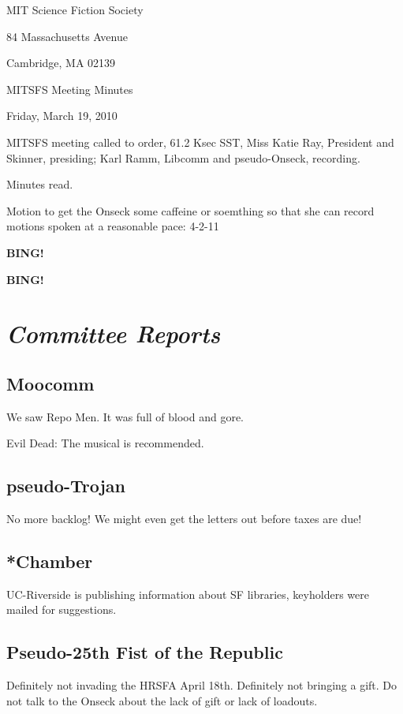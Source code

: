 \documentclass[10pt]{article}
\newcommand{\bing}{{\bf BING!} }
\newcommand{\goto}[1]{\bing \vskip 12pt \section*{{\em{#1}}}}
\newcommand{\skinner}{Miss Katie Ray, President and Skinner}
\newcommand{\onseck}{Karl Ramm, Libcomm and pseudo-Onseck}
\newcommand{\meetingdate}{Friday, March 19, 2010}
\begin{document}
\begin{center}

MIT Science Fiction Society

84 Massachusetts Avenue

Cambridge, MA 02139

\vspace{12pt}

MITSFS Meeting Minutes

\meetingdate

\end{center}

\vspace{18pt}

\setlength{\parskip}{6pt}

\noindent
MITSFS meeting called to order, 61.2 Ksec SST,
\skinner, presiding; \onseck, recording.

Minutes read.

Motion to get the Onseck some caffeine or soemthing so that she can record
motions spoken at a reasonable pace: 4-2-11 \s

\bing

\goto{Committee Reports}

\subsection*{Moocomm}

We saw Repo Men.  It was full of blood and gore.

Evil Dead: The musical is recommended.

\subsection*{pseudo-Trojan}

No more backlog!  We might even get the letters out before taxes are due!

\subsection*{*Chamber}

UC-Riverside is publishing information about SF libraries, keyholders were
mailed for suggestions.

\subsection*{Pseudo-25th Fist of the Republic}

Definitely not invading the HRSFA April 18th.  Definitely not bringing a
gift.  Do not talk to the Onseck about the lack of gift or lack of
loadouts.
\end{document}
